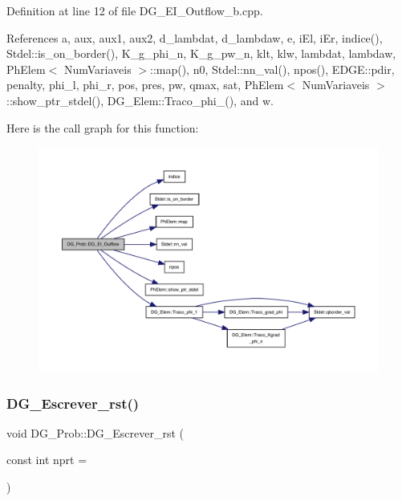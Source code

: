 Definition at line 12 of file D\+G\+\_\+\+E\+I\+\_\+\+Outflow\+\_\+b.\+cpp.



References a, aux, aux1, aux2, d\+\_\+lambdat, d\+\_\+lambdaw, e, i\+El, i\+Er, indice(), Stdel\+::is\+\_\+on\+\_\+border(), K\+\_\+g\+\_\+phi\+\_\+n, K\+\_\+g\+\_\+pw\+\_\+n, klt, klw, lambdat, lambdaw, Ph\+Elem$<$ Num\+Variaveis $>$\+::map(), n0, Stdel\+::nn\+\_\+val(), npos(), E\+D\+G\+E\+::pdir, penalty, phi\+\_\+l, phi\+\_\+r, pos, pres, pw, qmax, sat, Ph\+Elem$<$ Num\+Variaveis $>$\+::show\+\_\+ptr\+\_\+stdel(), D\+G\+\_\+\+Elem\+::\+Traco\+\_\+phi\+\_(), and w.

Here is the call graph for this function\+:
\nopagebreak
\begin{figure}[H]
\begin{center}
\leavevmode
\includegraphics[width=350pt]{classDG__Prob_a3e99ae33818db46884cd2683c741f36c_cgraph}
\end{center}
\end{figure}
\mbox{\label{classDG__Prob_a743c25d9cab0343541fccea15cae73a1}} 
\subsubsection{\texorpdfstring{D\+G\+\_\+\+Escrever\+\_\+rst()}{DG\_Escrever\_rst()}}
{\footnotesize\ttfamily void D\+G\+\_\+\+Prob\+::\+D\+G\+\_\+\+Escrever\+\_\+rst (\begin{DoxyParamCaption}\item[{const int}]{nprt = {} }\end{DoxyParamCaption})}



